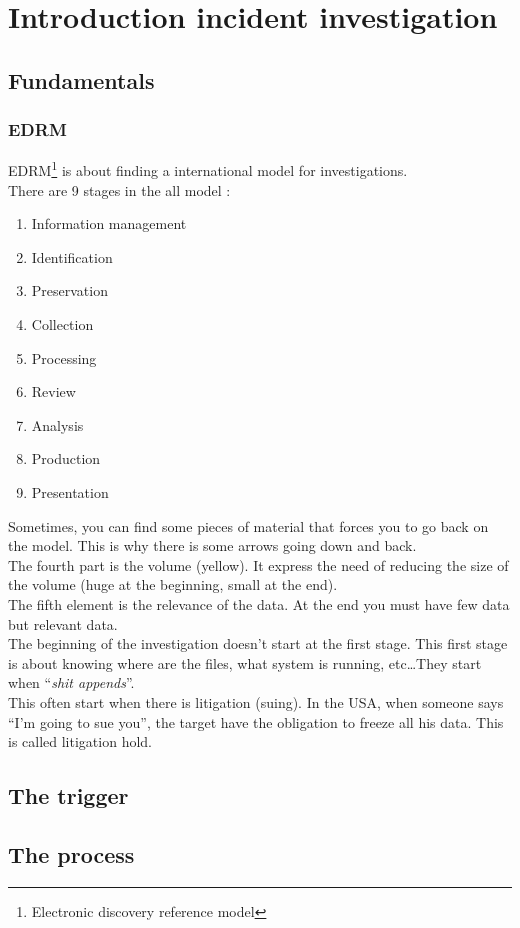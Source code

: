 \section{Introduction incident investigation}
\subsection{Fundamentals}
\subsubsection{EDRM}
EDRM\footnote{Electronic discovery reference model} is about finding a international model for investigations.\\
There are 9 stages in the all model :
\begin{enumerate}
 \item Information management
 \item Identification
 \item Preservation
 \item Collection
 \item Processing
 \item Review
 \item Analysis
 \item Production
 \item Presentation
\end{enumerate}
Sometimes, you can find some pieces of material that forces you to go back on the model. This is why there is some arrows going down and back.\\
The fourth part is the volume (yellow). It express the need of reducing the size of the volume (huge at the beginning, small at the end).\\
The fifth element is the relevance of the data. At the end you must have few data but relevant data.\\
The beginning of the investigation doesn't start at the first stage. This first stage is about knowing where are the files, what system is running, etc\ldots They start when \enquote{\textit{shit appends}}.\\
This often start when there is litigation (suing). In the USA, when someone says \enquote{I'm going to sue you}, the target have the obligation to freeze all his data. This is called litigation hold.
\subsection{The trigger}

\subsection{The process}
